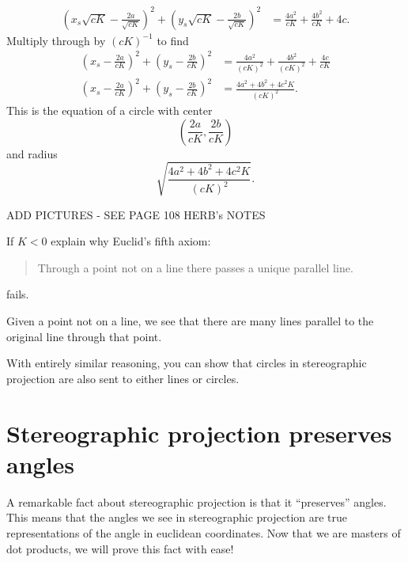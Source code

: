 \documentclass{ximera}
\begin{document}
\begin{problem}
\begin{freeResponse}
\begin{align*}
  \left(x_s\sqrt{cK} - \frac{2a}{\sqrt{cK}}\right)^2 + \left(y_s\sqrt{cK} - \frac{2b}{\sqrt{cK}}\right)^2&=\frac{4a^2}{cK} + \frac{4b^2}{cK} + 4c.
  \end{align*}
  Multiply through by $(cK)^{-1}$ to find
  \begin{align*}
    \left(x_s - \frac{2a}{cK}\right)^2 + \left(y_s - \frac{2b}{cK}\right)^2 &= \frac{4a^2}{(cK)^2} + \frac{4b^2}{(cK)^2} + \frac{4c}{cK}\\
    \left(x_s - \frac{2a}{cK}\right)^2 + \left(y_s - \frac{2b}{cK}\right)^2 &= \frac{4a^2 + 4b^2 + 4c^2K}{(cK)^2}.
  \end{align*}
  This is the equation of a circle with center
  \[
  \left(\frac{2a}{cK}, \frac{2b}{cK}\right)
  \]
  and radius
  \[
  \sqrt{\frac{4a^2 + 4b^2 + 4c^2K}{(cK)^2}}.
  \]
\end{freeResponse}
\end{problem}


ADD PICTURES - SEE PAGE 108 HERB's NOTES



\begin{problem}
  If $K<0$ explain why Euclid's fifth axiom:
  \begin{quote}
    Through a point not on a line there passes a unique parallel line.
  \end{quote}
  fails.
  \begin{freeResponse}
    Given a point not on a line, we see that there are many lines
    parallel to the original line through that point.
  \end{freeResponse}
\end{problem}



\begin{remark}
  With entirely similar reasoning, you can show that circles in
  stereographic projection are also sent to either lines or circles.
\end{remark}





\section{Stereographic projection preserves angles}


A remarkable fact about stereographic projection is that it
``preserves'' angles. This means that the angles we see in
stereographic projection are true representations of the angle in
euclidean coordinates.  Now that we are masters of dot products, we
will prove this fact with ease!
\end{document}
